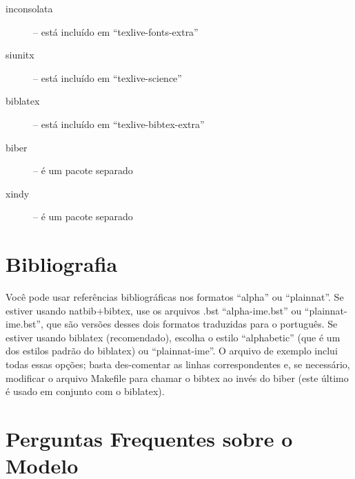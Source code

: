 \begin{description}
  \item[inconsolata] -- está incluído em ``texlive-fonts-extra''
  \item [siunitx] -- está incluído em ``texlive-science''
  \item [biblatex] -- está incluído em ``texlive-bibtex-extra''
  \item [biber] -- é um pacote separado
  \item [xindy] -- é um pacote separado
\end{description}

\section{Bibliografia}

Você pode usar referências bibliográficas nos formatos ``alpha'' ou ``plainnat''.
Se estiver usando natbib+bibtex, use os arquivos .bst
``alpha-ime.bst'' ou ``plainnat-ime.bst'', que são versões desses dois formatos
traduzidas para o português. Se estiver usando biblatex
(recomendado), escolha o estilo ``alphabetic'' (que é um dos estilos padrão do
biblatex) ou ``plainnat-ime''. O arquivo de exemplo inclui todas essas opções;
basta des-comentar as linhas correspondentes e, se necessário, modificar o
arquivo Makefile para chamar o bibtex ao invés do
biber (este último é usado em conjunto com o biblatex).

\section{Perguntas Frequentes sobre o Modelo}

